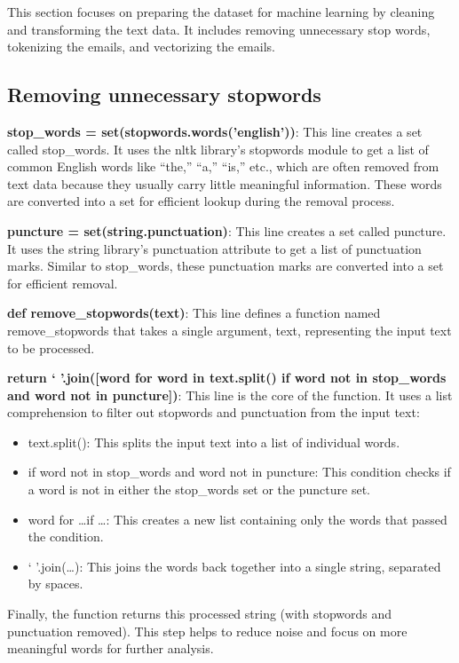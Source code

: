 This section focuses on preparing the dataset for machine learning by cleaning and transforming the text data.
It includes removing unnecessary stop words, tokenizing the emails, and vectorizing the emails.

\subsection{Removing unnecessary stopwords}
\label{subsec:removing-unnecessary-stopwords}

\textbf{stop\_words = set(stopwords.words('english'))}: This line creates a set called stop\_words.
It uses the nltk library's stopwords module to get a list of common English words like ``the,'' ``a,'' ``is,'' etc., which are often removed from text data because they usually carry little meaningful information.
These words are converted into a set for efficient lookup during the removal process.

\textbf{puncture = set(string.punctuation)}: This line creates a set called puncture.
It uses the string library's punctuation attribute to get a list of punctuation marks.
Similar to stop\_words, these punctuation marks are converted into a set for efficient removal.

\textbf{def remove\_stopwords(text)}: This line defines a function named remove\_stopwords that takes a single argument, text, representing the input text to be processed.

\textbf{return ` '.join([word for word in text.split() if word not in stop\_words and word not in puncture])}: This line is the core of the function.
It uses a list comprehension to filter out stopwords and punctuation from the input text:

\begin{itemize}
    \item text.split(): This splits the input text into a list of individual words.
    \item if word not in stop\_words and word not in puncture: This condition checks if a word is not in either the stop\_words set or the puncture set.
    \item \text{[}word for \dots if \dots\text{]}: This creates a new list containing only the words that passed the condition.
    \item ` '.join(\ldots): This joins the words back together into a single string, separated by spaces.
\end{itemize}

Finally, the function returns this processed string (with stopwords and punctuation removed).
This step helps to reduce noise and focus on more meaningful words for further analysis.

